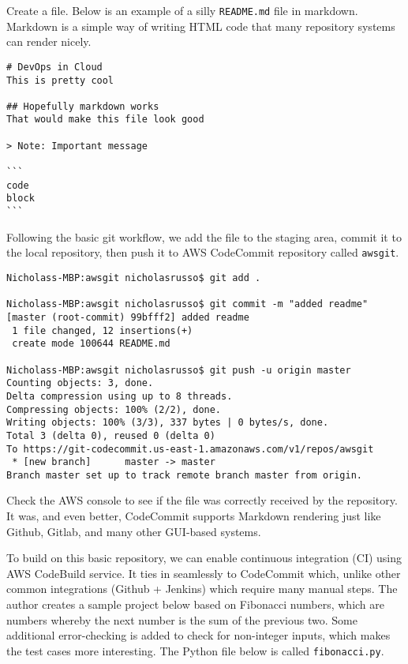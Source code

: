 Create a file. Below is an example of a silly \verb|README.md| file in markdown.
Markdown is a simple way of writing HTML code that many repository systems can
render nicely.

\begin{verbatim}
# DevOps in Cloud
This is pretty cool

## Hopefully markdown works
That would make this file look good

> Note: Important message

```
code
block
```
\end{verbatim}

Following the basic git workflow, we add the file to the staging area, commit
it to the local repository, then push it to AWS CodeCommit repository called
\verb|awsgit|.

\begin{verbatim}
Nicholass-MBP:awsgit nicholasrusso$ git add .

Nicholass-MBP:awsgit nicholasrusso$ git commit -m "added readme"
[master (root-commit) 99bfff2] added readme
 1 file changed, 12 insertions(+)
 create mode 100644 README.md

Nicholass-MBP:awsgit nicholasrusso$ git push -u origin master
Counting objects: 3, done.
Delta compression using up to 8 threads.
Compressing objects: 100% (2/2), done.
Writing objects: 100% (3/3), 337 bytes | 0 bytes/s, done.
Total 3 (delta 0), reused 0 (delta 0)
To https://git-codecommit.us-east-1.amazonaws.com/v1/repos/awsgit
 * [new branch]      master -> master
Branch master set up to track remote branch master from origin.
\end{verbatim}

Check the AWS console to see if the file was correctly received by the
repository. It was, and even better, CodeCommit supports Markdown rendering
just like Github, Gitlab, and many other GUI-based systems.


To build on this basic repository, we can enable continuous integration (CI)
using AWS CodeBuild service. It ties in seamlessly to CodeCommit which, unlike
other common integrations (Github + Jenkins) which require many manual steps.
The author creates a sample project below based on Fibonacci numbers, which
are numbers whereby the next number is the sum of the previous two. Some
additional error-checking is added to check for non-integer inputs, which
makes the test cases more interesting. The Python file below is called
\verb|fibonacci.py|.


